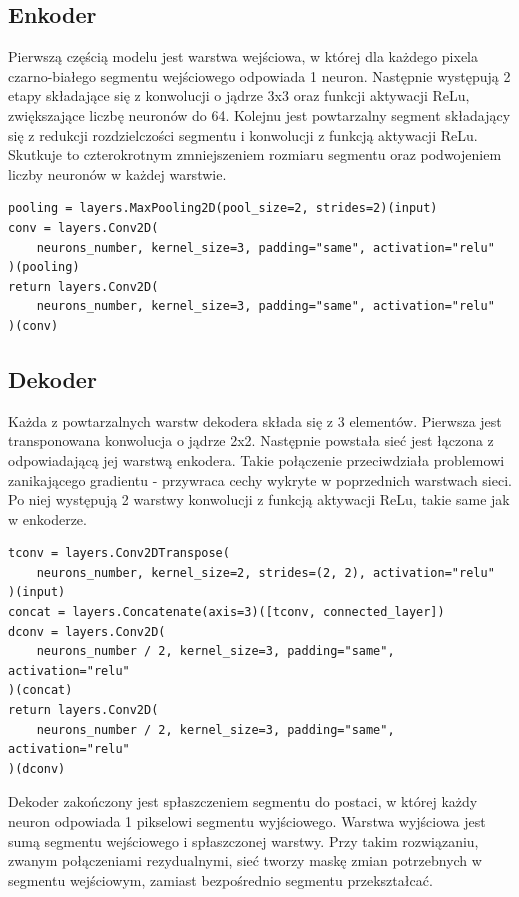 \documentclass[a4paper, 12pt]{article}
\begin{document}
\subsection{Enkoder}
Pierwszą częścią modelu jest warstwa wejściowa, w której dla każdego pixela czarno-białego segmentu wejściowego odpowiada 1 neuron.
Następnie występują 2 etapy składające się z konwolucji o jądrze 3x3 oraz funkcji aktywacji ReLu, zwiększające liczbę neuronów do 64.
Kolejnu jest powtarzalny segment składający się z redukcji rozdzielczości segmentu i konwolucji z funkcją aktywacji ReLu.
Skutkuje to czterokrotnym zmniejszeniem rozmiaru segmentu oraz podwojeniem liczby neuronów w każdej warstwie.
\newpage
\lstset{language=Python}
\lstset{frame=lines}
\lstset{basicstyle=\footnotesize}
\begin{lstlisting}
pooling = layers.MaxPooling2D(pool_size=2, strides=2)(input)
conv = layers.Conv2D(
    neurons_number, kernel_size=3, padding="same", activation="relu"
)(pooling)
return layers.Conv2D(
    neurons_number, kernel_size=3, padding="same", activation="relu"
)(conv)
\end{lstlisting}

\subsection{Dekoder}
Każda z powtarzalnych warstw dekodera składa się z 3 elementów.
Pierwsza jest transponowana konwolucja o jądrze 2x2. Następnie powstała sieć jest łączona z odpowiadającą jej warstwą enkodera.
Takie połączenie przeciwdziała problemowi zanikającego gradientu - przywraca cechy wykryte w poprzednich warstwach sieci.
Po niej występują 2 warstwy konwolucji z funkcją aktywacji ReLu, takie same jak w enkoderze.
\lstset{language=Python}
\lstset{frame=lines}
\lstset{basicstyle=\footnotesize}
\begin{lstlisting}
tconv = layers.Conv2DTranspose(
    neurons_number, kernel_size=2, strides=(2, 2), activation="relu"
)(input)
concat = layers.Concatenate(axis=3)([tconv, connected_layer])
dconv = layers.Conv2D(
    neurons_number / 2, kernel_size=3, padding="same", activation="relu"
)(concat)
return layers.Conv2D(
    neurons_number / 2, kernel_size=3, padding="same", activation="relu"
)(dconv)
\end{lstlisting}

Dekoder zakończony jest spłaszczeniem segmentu do postaci, w której każdy neuron odpowiada 1 pikselowi segmentu wyjściowego.
Warstwa wyjściowa jest sumą segmentu wejściowego i spłaszczonej warstwy.
Przy takim rozwiązaniu, zwanym połączeniami rezydualnymi, sieć tworzy maskę zmian potrzebnych w segmentu wejściowym,
zamiast bezpośrednio segmentu przekształcać. \cite{he2015deep}
\end{document}
